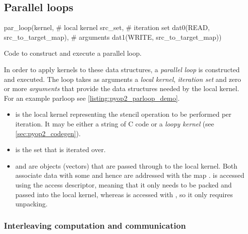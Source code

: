 \documentclass[thesis]{subfiles}
\begin{document}
\subsection{Parallel loops}

\begin{listing}
  \centering
  \begin{minipage}{.9\textwidth}
    \begin{pyalg2}
      par_loop(kernel,                          # local kernel
               src_set,                         # iteration set
               dat0(READ, src_to_target_map),   # arguments
               dat1(WRITE, src_to_target_map))
    \end{pyalg2}
  \end{minipage}
  \caption{
    Code to construct and execute a  parallel loop.
  }
  \label{listing:pyop2_parloop_demo}
\end{listing}

In order to apply kernels to these data structures, a \textit{parallel loop} is constructed and executed.
The loop takes as arguments a \textit{local kernel}, \textit{iteration set} and zero or more \textit{arguments} that provide the data structures needed by the local kernel.
For an example parloop see \cref{listing:pyop2_parloop_demo}.

\begin{itemize}
  \item
     is the local kernel representing the stencil operation to be performed per iteration.
    It may be either a string of C code or a \textit{loopy kernel} (see \cref{sec:pyop2_codegen}).
  \item
     is the set that is iterated over.
  \item
     and  are  objects (vectors) that are passed through to the local kernel.
    Both associate data with some  and hence are addressed with the map .
     is accessed using the  access descriptor, meaning that it only needs to be packed and passed into the local kernel, whereas  is accessed with , so it only requires unpacking.
\end{itemize}

\subsubsection{Interleaving computation and communication}
\end{document}
